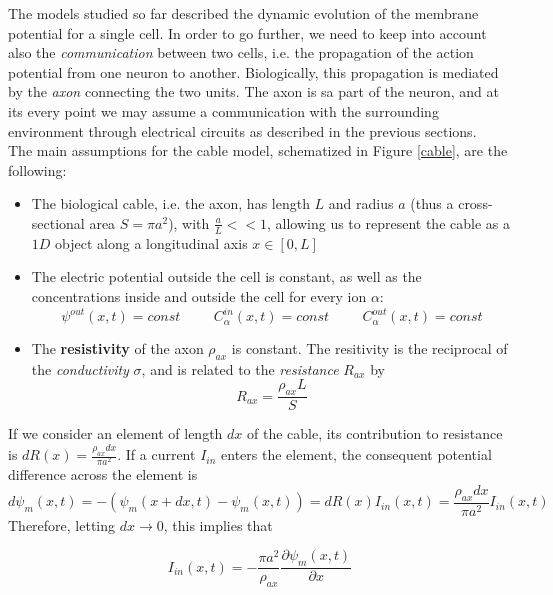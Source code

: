 \documentclass[12pt, a4paper]{article}
\begin{document}
The models studied so far described the dynamic evolution of the membrane potential  for a single cell. In order to go further, we need to keep into account also the \textit{communication} between two cells, i.e. the propagation of the action potential from one neuron to another. Biologically, this propagation is mediated by the \textit{axon} connecting the two units. The axon is sa part of the neuron, and at its every point we may assume a communication with the surrounding environment through electrical circuits as described in the previous sections.\\
The main assumptions for the cable model, schematized in Figure \ref{cable}, are the following:

\begin{itemize}
	
	\item The biological cable, i.e. the axon, has length $L$ and radius $a$ (thus a cross-sectional area  $S=\pi a^2$), with $\frac{a}{L} << 1$, allowing us to represent the cable as a $1D$ object along a longitudinal axis $ x \in [0,L]$
	
	\item The electric potential outside the cell is constant, as well as the concentrations inside and outside the cell for every ion $\alpha$: 
	$$ \psi^{out}(x,t) = const  \hspace{1cm} C_\alpha^{in}(x,t)  = const \hspace{1cm} C_\alpha^{out}(x,t)  = const$$
	
	\item The \textbf{resistivity} of the axon $\rho_{ax}$ is constant. The resitivity is the reciprocal of the \textit{conductivity} $\sigma$, and is related to the \textit{resistance} $R_{ax}$ by
	 $$ R_{ax} = \frac{\rho_{ax} L}{S} $$
	
	
\end{itemize}


If we consider an element of length $dx$ of the cable, its contribution to resistance is $dR(x) = \frac{\rho_{ax} dx}{\pi a^2}$. If a current $I_{in}$ enters the element, the consequent potential difference across the element is 
$$ d\psi_m(x,t) = - \left(\psi_m(x+dx,t) - \psi_m(x,t)\right) = dR(x)I_{in}(x,t) = \frac{\rho_{ax} dx}{\pi a^2} I_{in}(x,t)$$ Therefore, letting $dx \rightarrow 0$, this implies that

\begin{equation}
I_{in}(x,t) = -\frac{\pi a^2}{\rho_{ax}}\frac{\partial \psi_m(x,t)}{\partial x}
\end{equation}
\end{document}
